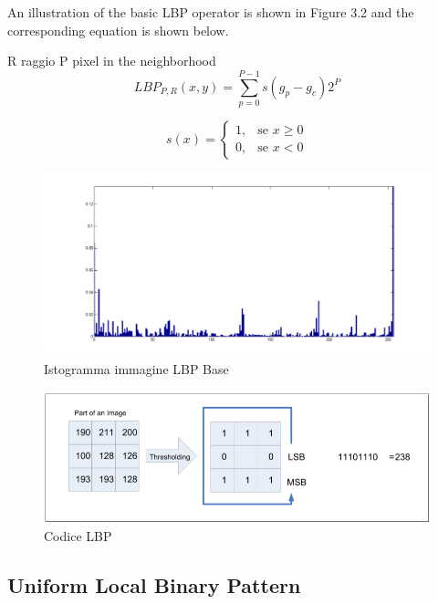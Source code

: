  An illustration of the basic LBP operator is shown in Figure 3.2
and the corresponding equation is shown below.

R raggio
P pixel in the neighborhood
\begin{equation}
LBP_{P,R}(x, y) = \sum_{p=0}^{P-1}{s(g_p - g_c)2^P}
\end{equation}

\begin{equation}
s(x) = 	\begin{cases} 1, & \mbox{se } x \ge 0 \\ 0, & \mbox{se } x < 0 \end{cases}
\end{equation}

\begin{figure}[ht]
\begin{center}
\includegraphics[width=.95\textwidth]{img/hist-complete}
\caption{ Istogramma immagine LBP Base }
\label{fig:istCompleteLBP}
\end{center}
\end{figure}

\begin{figure}[ht]
\begin{center}
\includegraphics[width=.95\textwidth]{img/LBP_code}
\caption{ Codice LBP }
\label{fig:LBPcode}
\end{center}
\end{figure}



\subsection{Uniform Local Binary Pattern}


